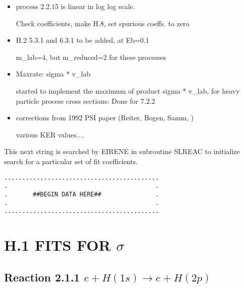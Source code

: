 \documentclass[12pt,dvipdfmx]{article}
\begin{document}
\begin{itemize}
\item{process 2.2.15 is linear in log log scale. }

Check coefficients, make H.8, set spurious coeffs. to zero
\item{H.2  5.3.1 and 6.3.1 to be added, at Eb=0.1}

m\_lab=4,  but m\_reduced=2 for these processes
\item {Maxrate: sigma * v\_lab }

started to implement the maximum of product sigma * v\_lab,
for heavy particle process cross sections:
Done for 7.2.2
\item{corrections from 1992 PSI paper (Reiter, Bogen, Samm, \cite{kn:Reiter92})}

various KER values....

\end{itemize}
\newpage

This next string is searched by EIRENE in subroutine SLREAC
to initialize search for a particular set of fit coefficients.

\bigskip
\begin{small}\begin{verbatim}
...........................................
.                                         .
.       ##BEGIN DATA HERE##               .
.                                         .
...........................................
\end{verbatim}\end{small}
\newpage
\renewcommand{\theHsection}{arabicsection.\thesection}
\renewcommand\thesection{\arabic{section}}
\setcounter{section}{0}

\section{H.1  FITS FOR $\sigma$}

\subsection{
Reaction 2.1.1 $   e + H(1s) \rightarrow e + H(2p) $}
\end{document}
